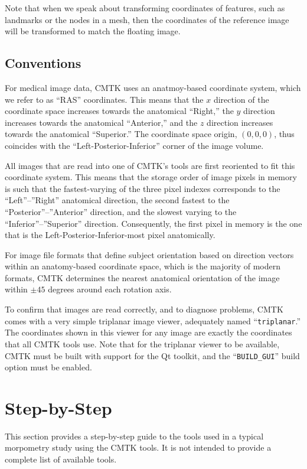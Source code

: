 \documentclass{InsightArticle}
\begin{document}
Note that when we speak about transforming coordinates of features, such as
landmarks or the nodes in a mesh, then the coordinates of the reference image
will be transformed to match the floating image.

\subsection{Conventions}

For medical image data, CMTK uses an anatmoy-based coordinate system, which we
refer to as ``RAS'' coordinates. This means that the $x$ direction of the
coordinate space increases towards the anatomical ``Right,'' the $y$ direction
increases towards the anatomical ``Anterior,'' and the $z$ direction increases
towards the anatomical ``Superior.'' The coordinate space origin, $(0,0,0)$,
thus coincides with the ``Left-Posterior-Inferior'' corner of the image
volume. 

All images that are read into one of CMTK's tools are first reoriented to fit
this coordinate system. This means that the storage order of image pixels in
memory is such that the fastest-varying of the three pixel indexes corresponds
to the ``Left''--''Right'' anatomical direction, the second fastest to the
``Posterior''--''Anterior'' direction, and the slowest varying to the
``Inferior''--''Superior'' direction. Consequently, the first pixel in memory
is the one that is the Left-Posterior-Inferior-most pixel anatomically.

For image file formats that define subject orientation based on direction
vectors within an anatomy-based coordinate space, which is the majority of
modern formats, CMTK determines the nearest anatomical orientation of the
image within $\pm 45$ degrees around each rotation axis.

To confirm that images are read correctly, and to diagnose problems, CMTK
comes with a very simple triplanar image viewer, adequately named
``\verb|triplanar|.'' The coordinates shown in this viewer for any image are
exactly the coordinates that all CMTK tools use. Note that for the triplanar
viewer to be available, CMTK must be built with support for the Qt toolkit,
and the ``\verb|BUILD_GUI|'' build option must be enabled.

\section{Step-by-Step}

This section provides a step-by-step guide to the tools used in a typical
morpometry study using the CMTK tools. It is not intended to provide a
complete list of available tools.
\end{document}
